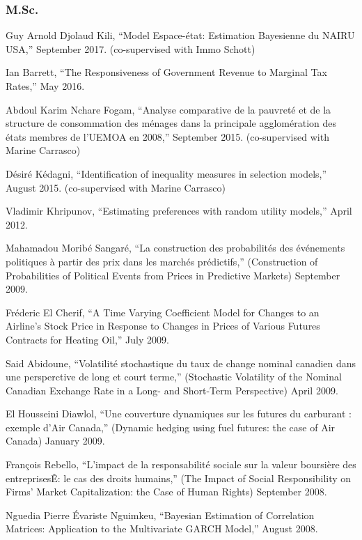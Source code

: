\documentclass[12pt]{article}
\begin{document}
\subsubsection*{M.Sc.}

Guy Arnold Djolaud Kili,
``Model Espace-\'etat: Estimation Bayesienne du NAIRU USA,''
September 2017. (co-supervised with Immo Schott)

Ian Barrett,
``The Responsiveness of Government Revenue to Marginal Tax Rates,''
May 2016.

Abdoul Karim Nchare Fogam,
``Analyse comparative de la pauvret\'e et de la structure de consommation des m\'enages dans la principale agglom\'eration des \'etats membres de l’UEMOA en 2008,''
September 2015. (co-supervised with Marine Carrasco)

D\'esir\'e K\'edagni,
``Identification of inequality measures in selection models,''
August 2015. (co-supervised with Marine Carrasco)

Vladimir Khripunov,
``Estimating preferences with random utility models,''
April 2012.

Mahamadou Morib\'e Sangar\'e,
``La construction des probabilit\'es des \'ev\'enements politiques \`a 
partir des prix dans les march\'es pr\'edictifs,''
(Construction of Probabilities of Political Events from Prices in Predictive Markets)
September 2009.

Fr\'ederic El Cherif,
``A Time Varying Coefficient Model for Changes to an Airline's Stock Price in 
Response to Changes in Prices of Various Futures Contracts for Heating Oil,''
July 2009.

Said Abidoune,
``Volatilit\'e stochastique du taux de change nominal canadien dans une persperctive de long et court terme,''
(Stochastic Volatility of the Nominal Canadian Exchange Rate in a Long- and Short-Term Perspective)
April 2009.

El Housseini Diawlol,
``Une couverture dynamiques sur les futures du carburant : exemple d'Air Canada,''
(Dynamic hedging using fuel futures: the case of Air Canada)
January 2009.

Fran\c{c}ois Rebello,
``L'impact de la responsabilit\'e sociale sur la valeur boursi\`ere des entreprisesÊ: le cas des droits humains,''
(The Impact of Social Responsibility on Firms' Market Capitalization: the Case of Human Rights)
September 2008.

Nguedia Pierre \'Evariste Nguimkeu,
``Bayesian Estimation of Correlation Matrices:
Application to the Multivariate GARCH Model,''
August 2008.
\end{document}
